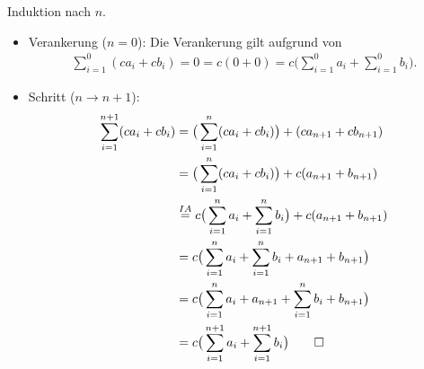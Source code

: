 Induktion nach $n$.
\begin{itemize}
	\item Verankerung ($n=0$): Die Verankerung gilt aufgrund von
	      \begin{align*}
		      \sum_{i=1}^0(ca_i+cb_i)=0=c(0+0)=c\big(\sum_{i=1}^0a_i+\sum_{i=1}^0b_i\big).
	      \end{align*}
	\item Schritt ($n\to n+1$):
	      \begin{align*}
		      \sum_{i=1}^{n+1}(ca_i+cb_i) & =\big(\sum_{i=1}^n(ca_i+cb_i)\big)+(ca_{n+1}+cb_{n+1})                        \\
		                                  & =\big(\sum_{i=1}^n(ca_i+cb_i)\big)+c(a_{n+1}+b_{n+1})                         \\
		                                  & \stackrel{IA}{=}c\big(\sum_{i=1}^na_i+\sum_{i=1}^nb_i\big)+c(a_{n+1}+b_{n+1}) \\
		                                  & =c\big( \sum_{i=1}^na_i+\sum_{i=1}^nb_i+a_{n+1}+b_{n+1} \big)                 \\
		                                  & =c\big( \sum_{i=1}^na_i+a_{n+1}+\sum_{i=1}^nb_i+b_{n+1} \big)                 \\
		                                  & =c\big( \sum_{i=1}^{n+1}a_i+\sum_{i=1}^{n+1}b_i\big)\qedhere
	      \end{align*}
\end{itemize}
